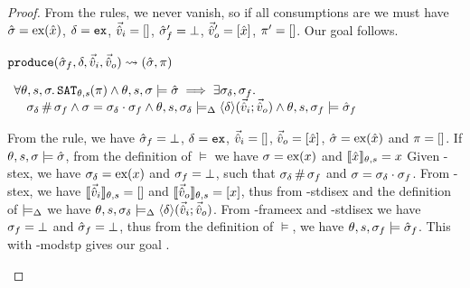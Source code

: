 \begin{proof}
From the \consume{} rules, we never vanish, so if all consumptions are \Ok{} we must have $\hat{\sigma}=\text{ex}(\hat{x})$, $\delta=\texttt{ex}$, $\vec{\hat{v}}_i=[]$, $\hat{\sigma}_f'=\bot$, $\vec{\hat{v}}_o'=[\hat{x}]$, $\pi'=[]$. Our goal  follows.


\pfassume \begin{hypvlist}
 $\texttt{produce}(\hat{\sigma}_f,\delta,\vec{\hat{v}}_i,\vec{\hat{v}}_o)\rightsquigarrow (\hat{\sigma}, \pi)$
\end{hypvlist}
\pfprove \begin{goalvlist}
 $\begin{array}{l}
\forall\theta,s,\sigma\ldotp \texttt{SAT}_{\mathit{\theta,s}}(\pi) \land \theta,s,\sigma\models\hat{\sigma} \implies \exists \sigma_\delta, \sigma_f\ldotp \\
\quad \sigma_\delta\operatorname{\#}\sigma_f \land \sigma=\sigma_\delta\cdot\sigma_f \land \theta,s,\sigma_\delta \models_{\Delta} \left<\delta\right>\!(\vec{\hat{v}}_i;\vec{\hat{v}}_o) \land \theta,s,\sigma_f \models \hat{\sigma}_f
\end{array}$
\end{goalvlist}
\begin{hypvlist}
 From the \produce{} rule, we have $\hat{\sigma}_f=\bot$, $\delta=\texttt{ex}$, $\vec{\hat{v}}_i=[]$, $\vec{\hat{v}}_o=[\hat{x}]$, $\hat{\sigma}=\text{ex}(\hat{x})$ and $\pi=[]$.
 If $\theta,s,\sigma\models\hat{\sigma}$, from the definition of $\models$ we have $\sigma=\text{ex}(x)$ and $\llbracket\hat{x}\rrbracket_{\theta,s}=x$
 Given \hyp{stex}, we have $\sigma_\delta=\text{ex}(x)$ and $\sigma_f=\bot$, such that $\sigma_\delta\operatorname{\#}\sigma_f$ and $\sigma=\sigma_\delta\cdot\sigma_f$.
 From \hyp{stex}, we have $\llbracket\vec{\hat{v}}_i\rrbracket_{\theta,s}=[]$ and $\llbracket\vec{\hat{v}}_o\rrbracket_{\theta,s}=[x]$, thus from \hyp{stdisex} and the definition of $\models_{\Delta}$ we have $\theta,s,\sigma_\delta\models_{\Delta}\left<\delta\right>\!(\vec{\hat{v}}_i;\vec{\hat{v}}_o)$.
 From \hyp{frameex} and \hyp{stdisex} we have $\sigma_f=\bot$ and $\hat{\sigma}_f=\bot$, thus from the definition of $\models$, we have $\theta,s,\sigma_f\models\hat{\sigma}_f$. This with \hyp{modstp} gives our goal .
\end{hypvlist}



\end{proof}
